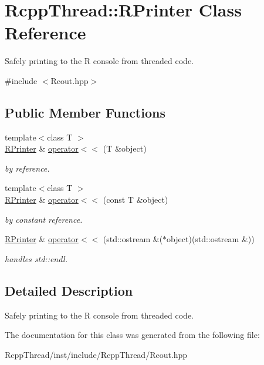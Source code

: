 \hypertarget{class_rcpp_thread_1_1_r_printer}{}\section{Rcpp\+Thread\+:\+:R\+Printer Class Reference}
\label{class_rcpp_thread_1_1_r_printer}


Safely printing to the R console from threaded code.  




{\ttfamily \#include $<$Rcout.\+hpp$>$}

\subsection*{Public Member Functions}
\begin{DoxyCompactItemize}
\item 
{\footnotesize template$<$class T $>$ }\\\hyperlink{class_rcpp_thread_1_1_r_printer}{R\+Printer} \& \hyperlink{group__formatting_gaeea190c50570dc8f857c8f58716f8418}{operator$<$$<$} (T \&object)
\begin{DoxyCompactList}\small\item\em by reference. \end{DoxyCompactList}\item 
{\footnotesize template$<$class T $>$ }\\\hyperlink{class_rcpp_thread_1_1_r_printer}{R\+Printer} \& \hyperlink{group__formatting_ga14488ec1ba0121b3e34cc2291edeaef7}{operator$<$$<$} (const T \&object)
\begin{DoxyCompactList}\small\item\em by constant reference. \end{DoxyCompactList}\item 
\hyperlink{class_rcpp_thread_1_1_r_printer}{R\+Printer} \& \hyperlink{group__formatting_ga1f4bfba8cc5853c021816ffce7714601}{operator$<$$<$} (std\+::ostream \&($\ast$object)(std\+::ostream \&))
\begin{DoxyCompactList}\small\item\em handles std\+::endl. \end{DoxyCompactList}\end{DoxyCompactItemize}


\subsection{Detailed Description}
Safely printing to the R console from threaded code. 

The documentation for this class was generated from the following file\+:\begin{DoxyCompactItemize}
\item 
Rcpp\+Thread/inst/include/\+Rcpp\+Thread/Rcout.\+hpp\end{DoxyCompactItemize}
